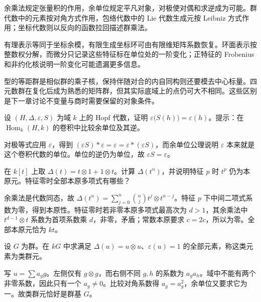 \begin{chaptersummary}
	余乘法规定张量积的作用，余单位规定平凡对象，对极使对偶和求逆成为可能。群代数中的元素按对角方式作用，包络代数中的 Lie 代数生成元按 Leibniz 方式作用；坐标代数则以反向的函数拉回描述群乘法。

	\ProseParagraphBreak
	有理表示等同于坐标余模，有限生成坐标环可由有限维矩阵系数恢复。环面表示按整数权分解，而微分只记录这些特征标在单位处的一阶变化；正特征的 Frobenius 和非约化核说明一阶变化可能遗漏更多信息。

	\ProseParagraphBreak
	型的等距群是相似群的乘子核，保持伴随对合的内自同构则还要模去中心标量。四元数群在复化后成为熟悉的矩阵群，但其实际底域上的点仍可大不相同。这些区别是下一章讨论不变量与商时需要保留的对象条件。
\end{chaptersummary}

\BookExercises
\begin{optionalexercise}\label{b5:ex:21:01}
	设 \((H,\Delta,\varepsilon,S)\) 为域 \(k\) 上的 Hopf 代数，证明 \(\varepsilon\bigl(S(h)\bigr)=\varepsilon(h)\)。提示：在 \(\operatorname{Hom}_k(H,k)\) 的卷积中比较余单位及其逆。
\end{optionalexercise}
\begin{solution}
	对极等式应用 \(\varepsilon\)，得到 \((\varepsilon S)*\varepsilon=\varepsilon=\varepsilon*(\varepsilon S)\)，而余单位公理说明 \(\varepsilon\) 本来就是这个卷积代数的单位。单位的逆仍为单位，故 \(\varepsilon S=\varepsilon\)。
\end{solution}

\begin{optionalexercise}\label{b5:ex:21:02}
	在 \(k[t]\) 上取 \(\Delta(t)=t\otimes1+1\otimes t\)。计算 \(\Delta(t^n)\)，并说明特征 \(p\) 时 \(t^p\) 仍为本原元。特征零时全部本原多项式有哪些？
\end{optionalexercise}
\begin{solution}
	余乘法是代数同态，故 \(\Delta(t^n)=\sum_{j=0}^n\binom njt^j\otimes t^{n-j}\)。特征 \(p\) 下中间二项式系数为零，得到本原性。特征零时若非零本原多项式最高次为 \(d>1\)，其余乘法中 \(t^{d-1}\otimes t\) 系数为首项系数乘 \(d\)，非零，矛盾；常数本原要求 \(c=2c\)，所以为零。全部本原元恰为 \(kt\)。
\end{solution}

\begin{optionalexercise}\label{b5:ex:21:03}
	设 \(G\) 为群。在 \(kG\) 中求满足 \(\Delta(u)=u\otimes u\)、\(\varepsilon(u)=1\) 的全部元素，称这类元素为类群元。
\end{optionalexercise}
\begin{solution}
	写 \(u=\sum a_gg\)。左侧仅有 \(g\otimes g\)，而右侧不同 \(g,h\) 的系数为 \(a_ga_h\)。域中不能有两个非零系数，因此只有一个 \(a_g\ne0\)。比较对角系数得 \(a_g=a_g^2\)，余单位又要求它为一。故类群元恰好是群基 \(G\)。
\end{solution}


